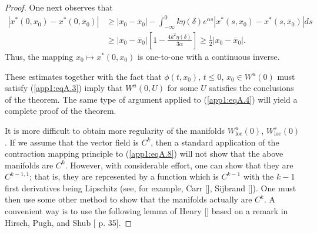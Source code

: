 \documentclass{surv-l}
\theoremstyle{plain}
\theoremstyle{definition}
\numberwithin{equation}{section}
\numberwithin{figure}{chapter}
\begin{document}
\begin{proof}
One next observes that
\begin{align*}
|x^{\ast}(0, x_{0})-x^{\ast}(0,\overline{x}_{0})|&\geq|x_{0}-\overline{x}_{0}|-\int_{-\infty}^{0}k\eta(\delta)e^{\alpha s}|x^{\ast}(s, x_{0})-x^{\ast}(s, \overline{x}_{0})|ds\\
&\geq|x_{0}-\overline{x}_{0}|\left[1-\frac{4k^{2}\eta(\delta)}{3\alpha}\right]\geq\frac{1}{2}|x_{0}-\overline{x}_{0}|.
\end{align*}
Thus, the mapping $x_{0}\mapsto x^{\ast}(0, x_{0})$ is one-to-one with a continuous inverse.

These estimates together with the fact that $\phi(t, x_{0})$, $t\leq 0$, $x_{0}\in W^{u}(0)$ must satisfy (\ref{app1:eqA.3}) imply that $W^{u}(0, U)$ for some $U$ satisfies the conclusions of the theorem. The same type of argument applied to (\ref{app1:eqA.4}) will yield a complete proof of the theorem.

It is more difficult to obtain more regularity of the manifolds $W_{\mathrm{loc}}^{u}(0)$, $W_{\mathrm{loc}}^{s}(0)$. If we assume that the vector field is $C^{k}$, then a standard application of the contraction mapping principle to (\ref{app1:eqA.8}) will not show that the above manifolds are $C^{k}$. However, with considerable effort, one can show that they are $C^{k-1,1}$; that is, they are represented by a function which is $C^{k-1}$ with the $k-1$ first derivatives being Lipschitz (see, for example, Carr [\citeyear{1981c}], Sijbrand [\citeyear{1985s}]). One must then use some other method to show that the manifolds actually are $C^{k}$. A convenient way is to use the following lemma of Henry [\citeyear{1983h}] based on a remark in Hirsch, Pugh, and Shub [\citeyear{1977hps} p. 35].
\end{proof}
\end{document}
